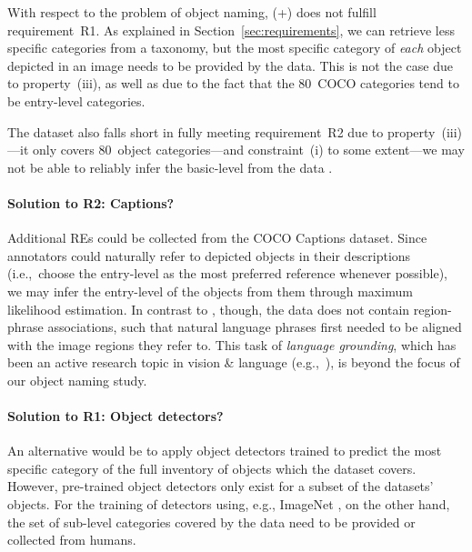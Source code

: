 {%

With respect to the problem of object naming, (+) does not fulfill requirement~R1. 
As explained in Section~\ref{sec:requirements}, we can retrieve less specific categories from a taxonomy, but the most specific category of \textit{each} object depicted in an image needs to be provided by the data. 
This is not the case due to property~(iii), as well as due to the fact that the $80$~COCO categories tend to be entry-level categories. 
%

The dataset also falls short in fully meeting requirement~R2 due to property~(iii)---it only covers 80~object categories---and constraint~(i) to some extent---we may not be able to reliably infer the basic-level from the data . 

\paragraph{Solution to R2: Captions?}
Additional REs could be collected from the COCO Captions dataset. %
Since annotators could naturally refer to depicted objects in their descriptions (i.e.,~choose the entry-level as the most preferred reference whenever possible), we may infer the entry-level of the objects from them through maximum likelihood estimation. 
%
In contrast to \flickr, though, the data does not contain region-phrase associations,  %
such that natural language phrases first needed to be aligned with the image regions they refer to. 
This task of \textit{language grounding}, which has been an active research topic in vision \& language (e.g.,~\cite{kong2014what,karpathy2015deep,rohrbach2016grounding}), is beyond the focus of our object naming study. 

\paragraph{Solution to R1: Object detectors?}
An alternative would be to apply object detectors trained to predict the most specific category of the full inventory of objects which the dataset covers. 
However, pre-trained object detectors only exist for a subset of the datasets' objects. 
For the training of detectors using, e.g., ImageNet \cite{imagenet_cvpr09}, on the other hand, the  set of sub-level categories covered by the data need to be provided or collected from humans. 

}
